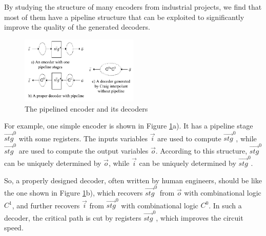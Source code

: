 \documentclass[twocolumn]{article}
\begin{document}
By studying the structure of many encoders from industrial projects,
we find that most of them have a pipeline structure that can be exploited to
significantly improve the quality of the generated decoders.

\begin{figure}[t]
\begin{center}
\includegraphics[width=0.5\textwidth]{pipeline}
\end{center}
\caption{The pipelined encoder and its decoders}
  \label{fig_pipe}
\end{figure}

For example,
one simple encoder is shown in Figure \ref{fig_pipe}a).
It has a pipeline stage $\vec{stg}^0$ with some registers.
The inputs variables $\vec{i}$ are used to compute $\vec{stg}^0$,
while $\vec{stg}^0$ are used to compute the output variables $\vec{o}$.
According to this structure,
$\vec{stg}^0$ can be uniquely determined by $\vec{o}$,
while $\vec{i}$ can be uniquely determined by $\vec{stg}^0$.

So,
a properly designed decoder,
often written by human engineers,
should be like the one shown in Figure \ref{fig_pipe}b),
which recovers $\vec{stg}^0$ from $\vec{o}$ with combinational logic $C^1$,
and further recovers $\vec{i}$ from $\vec{stg}^0$ with combinational logic $C^0$.
In such a decoder,
the critical path is cut by registers $\vec{stg}^0$, 
which improves the circuit speed.

% 
\end{document}
